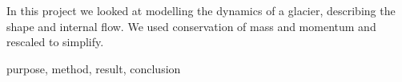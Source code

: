 In this project we looked at modelling the dynamics of a glacier, describing the shape and internal flow. We used conservation of mass and momentum and rescaled to simplify. 

purpose, method, result, conclusion